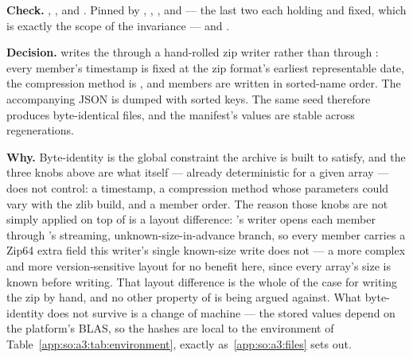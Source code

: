 \begin{sloppypar}
\textbf{Check.} , ,
 and . Pinned by
,
,
,
and  ---
the last two each holding  and  fixed, which
is exactly the scope of the invariance --- and
.
\end{sloppypar}

\label{app:so:a4:r5}

\textbf{Decision.}  writes the 
through a hand-rolled zip writer rather than through : every
member's timestamp is fixed at the zip format's earliest representable date,
the compression method is , and members are written in
sorted-name order. The
accompanying JSON is dumped with sorted keys. The same seed therefore produces
byte-identical files, and the manifest's  values are stable
across regenerations.

\textbf{Why.} Byte-identity is the global constraint the archive is built to
satisfy, and the three knobs above are what  itself --- already
deterministic for a given array --- does not control: a timestamp, a
compression method whose parameters could vary with the zlib build, and a
member order. The reason those knobs are not simply applied on top of
 is a layout difference: 's writer opens each
member through 's streaming, unknown-size-in-advance branch, so
every member carries a Zip64 extra field this writer's single known-size write
does not --- a more complex and more version-sensitive layout for no benefit
here, since every array's size is known before writing. That layout difference
is the whole of the case for writing the zip by hand, and no other property of
 is being argued against. What byte-identity does not survive
is a change of machine --- the stored values depend on the platform's BLAS, so
the hashes are local to the environment of
Table~\ref{app:so:a3:tab:environment}, exactly as~\ref{app:so:a3:files} sets
out.


